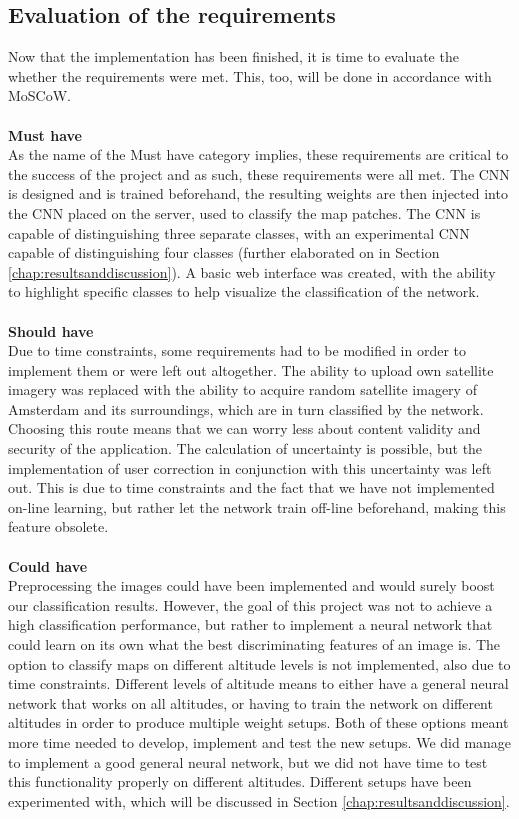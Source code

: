 \documentclass[a4paper,onecolumn]{report}
\begin{document}
\subsection{Evaluation of the requirements}
Now that the implementation has been finished, it is time to evaluate the whether the requirements were met. This, too, will be done in accordance with MoSCoW.\\
\\
\textbf{Must have}\\
As the name of the Must have category implies, these requirements are critical to the success of the project and as such, these requirements were all met. The CNN is designed and is trained beforehand, the resulting weights are then injected into the CNN placed on the server, used to classify the map patches. The CNN is capable of distinguishing three separate classes, with an experimental CNN capable of distinguishing four classes (further elaborated on in Section \ref{chap:resultsanddiscussion}).
A basic web interface was created, with the ability to highlight specific classes to help visualize the classification of the network.\\
\\
\textbf{Should have}\\
Due to time constraints, some requirements had to be modified in order to implement them or were left out altogether. The ability to upload own satellite imagery was replaced with the ability to acquire random satellite imagery of Amsterdam and its surroundings, which are in turn classified by the network. Choosing this route means that we can worry less about content validity and security of the application. The calculation of uncertainty is possible, but the implementation of user correction in conjunction with this uncertainty was left out. This is due to time constraints and the fact that we have not implemented on-line learning, but rather let the network train off-line beforehand, making this feature obsolete.\\
\\
\textbf{Could have}\\
Preprocessing the images could have been implemented and would surely boost our classification results. However, the goal of this project was not to achieve a high classification performance, but rather to implement a neural network that could learn on its own what the best discriminating features of an image is. The option to classify maps on different altitude levels is not implemented, also due to time constraints. Different levels of altitude means to either have a general neural network that works on all altitudes, or having to train the network on different altitudes in order to produce multiple weight setups. Both of these options meant more time needed to develop, implement and test the new setups. We did manage to implement a good general neural network, but we did not have time to test this functionality properly on different altitudes. Different setups have been experimented with, which will be discussed in Section \ref{chap:resultsanddiscussion}.\\
\end{document}
